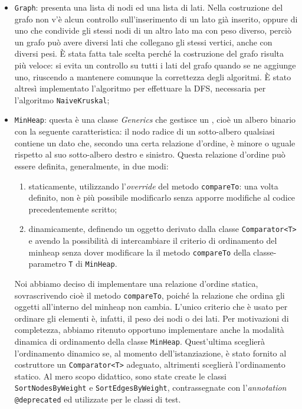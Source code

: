 \begin{itemize}
\begin{itemize}
		\end{itemize}
	\item \texttt{Graph}: presenta una lista di nodi ed una lista di lati. Nella costruzione del grafo non v'è alcun controllo sull'inserimento di un lato già inserito, oppure di uno che condivide gli stessi nodi di un altro lato ma con peso diverso, perciò un grafo può avere diversi lati che collegano gli stessi vertici, anche con diversi pesi. È stata fatta tale scelta perché la costruzione del grafo risulta più veloce:  si evita un controllo su tutti i lati del grafo quando se ne aggiunge uno, riuscendo a mantenere comunque la correttezza degli algoritmi. È stato altresì implementato l'algoritmo per effettuare la DFS, necessaria per l'algoritmo \texttt{NaiveKruskal};	
	\item \texttt{MinHeap}: questa è una classe \emph{Generics} che gestisce un , cioè un albero binario con la seguente caratteristica: il nodo radice di un sotto-albero qualsiasi contiene un dato che, secondo una certa relazione d'ordine, è minore o uguale rispetto al suo sotto-albero destro e sinistro. Questa relazione d'ordine può essere definita, generalmente, in due modi:
	\begin{enumerate}
		\item staticamente, utilizzando l'\emph{override} del metodo \texttt{compareTo}: una volta definito, non è più possibile modificarlo senza apporre modifiche al codice precedentemente scritto;
		\item dinamicamente, definendo un oggetto derivato dalla classe \texttt{Comparator<T>} e avendo la possibilità di intercambiare il criterio di ordinamento del minheap senza dover modificare la il metodo \texttt{compareTo} della classe-parametro \texttt{T} di \texttt{MinHeap}.
	\end{enumerate}
	Noi abbiamo deciso di implementare una relazione d'ordine statica, sovrascrivendo cioè il metodo \texttt{compareTo}, poiché la relazione che ordina gli oggetti all'interno del minheap non cambia. L'unico criterio che è usato per ordinare gli elementi è, infatti, il peso dei nodi o dei lati. Per motivazioni di completezza, abbiamo ritenuto opportuno implementare anche la modalità dinamica di ordinamento della classe \texttt{MinHeap}. Quest'ultima sceglierà l'ordinamento dinamico se, al momento dell'istanziazione, è stato fornito al costruttore un \texttt{Comparator<T>} adeguato, altrimenti sceglierà l'ordinamento statico. \eqcapo
	Al mero scopo didattico, sono state create le classi \texttt{SortNodesByWeight} e \texttt{SortEdgesByWeight}, contrassegnate con l'\emph{annotation} \texttt{@deprecated} ed utilizzate per le classi di test.\eqcapo

\end{itemize}
